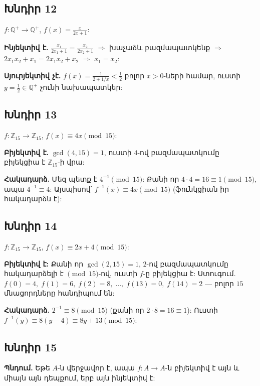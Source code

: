 \subsection*{Խնդիր 12}
$f:\mathbb{Q}^+\to\mathbb{Q}^+$, $f(x)=\frac{x}{2x+1}$:

\textbf{Ինյեկտիվ է.} $\frac{x_1}{2x_1+1}=\frac{x_2}{2x_2+1}$ $\Rightarrow$ խաչաձև բազմապատկենք $\Rightarrow$ $2x_1x_2+x_1=2x_1x_2+x_2$ $\Rightarrow$ $x_1=x_2$: \checkmark

\textbf{Սյուրյեկտիվ չէ.} $f(x)=\frac{1}{2+1/x}<\frac{1}{2}$ բոլոր $x>0$-ների համար, ուստի $y=\frac{1}{2}\in\mathbb{Q}^+$ չունի նախապատկեր: \checkmark

\subsection*{Խնդիր 13}
$f:\mathbb{Z}_{15}\to\mathbb{Z}_{15}$, $f(x)\equiv 4x\pmod{15}$:

\textbf{Բիյեկտիվ է.} $\gcd(4,15)=1$, ուստի $4$-ով բազմապատկումը բիյեկցիա է $\mathbb{Z}_{15}$-ի վրա:

\textbf{Հակադարձ.} Մեզ պետք է $4^{-1}\pmod{15}$: Քանի որ $4\cdot 4=16\equiv 1\pmod{15}$, ապա $4^{-1}\equiv 4$: Այսպիսով՝ $f^{-1}(x)\equiv 4x\pmod{15}$ (ֆունկցիան իր հակադարձն է):

\subsection*{Խնդիր 14}
$f:\mathbb{Z}_{15}\to\mathbb{Z}_{15}$, $f(x)\equiv 2x+4\pmod{15}$:

\textbf{Բիյեկտիվ է:} Քանի որ $\gcd(2,15)=1$, $2$-ով բազմապատկումը հակադարձելի է $\pmod{15}$-ով, ուստի $f$-ը բիյեկցիա է: Ստուգում. $f(0)=4,\;f(1)=6,\;f(2)=8,\;\ldots,\;f(13)=0,\;f(14)=2$ --- բոլոր $15$ մնացորդները հանդիպում են:

\textbf{Հակադարձ.} $2^{-1}\equiv 8\pmod{15}$ (քանի որ $2\cdot 8=16\equiv 1$): Ուստի $f^{-1}(y)\equiv 8(y-4)\equiv 8y+13\pmod{15}$:

\subsection*{Խնդիր 15}
\textbf{Պնդում.} Եթե $A$-ն վերջավոր է, ապա $f:A\to A$-ն բիյեկտիվ է այն և միայն այն դեպքում, երբ այն ինյեկտիվ է:


